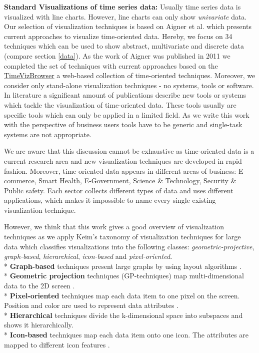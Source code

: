 \textbf{Standard Visualizations of time series data:}
Usually time series data is visualized with line charts. However, line charts can only show \textit{univariate} data. Our selection of visualization techniques is based on Aigner et al.  \cite{Aigner2011} which presents current approaches to visualize time-oriented data. Hereby, we focus on 34 techniques which can be used to show abstract, multivariate and discrete data (compare section \ref{data}). 
As the work of Aigner was published in 2011 we completed the set of techniques with current approaches based on the \href{http://survey.timeviz.net/}{TimeVizBrowser} a web-based collection of time-oriented techniques. Moreover, we consider only stand-alone visualization techniques - no systems, tools or software. In literature a significant amount of publications describe new tools or systems which tackle the visualization of time-oriented data. These tools usually are specific tools which can only be applied in a limited field. As we write this work with the perspective of business users tools have to be generic and single-task systems are not appropriate.

We are aware that this discussion cannot be exhaustive as time-oriented data is a current research area and new visualization techniques are developed in rapid fashion.
Moreover, time-oriented data appears in different areas of business: E-commerce, Smart Health, E-Government, Science \& Technology, Security \& Public safety. Each sector collects different types of data and uses different applications, which makes it impossible to name every single existing visualization technique.


However, we think that this work gives a good overview of visualization techniques as we apply Keim's taxonomy  \cite{Keim1995} of visualization techniques for large data which classifies visualizations into the following classes: \textit{geometric-projective}, \textit{graph-based}, \textit{hierarchical}, \textit{icon-based} and \textit{pixel-oriented}.
\\*
\textbf{Graph-based} techniques present large graphs by using layout algorithms  \cite{Keim1996}.\\*
\textbf{Geometric projection} techniques (GP-techniques) map multi-dimensional data to the 2D screen  \cite{FerreiradeOliveira2003}.\\*
\textbf{Pixel-oriented} techniques map each data item to one pixel on the screen. Position and color are used to represent data attributes  \cite{Keim1996}.\\*
\textbf{Hierarchical} techniques divide the k-dimensional space into subspaces and shows it hierarchically. \\*
\textbf{Icon-based} techniques map each data item onto one icon. The attributes are mapped to different icon features  \cite{Keim2001}.
